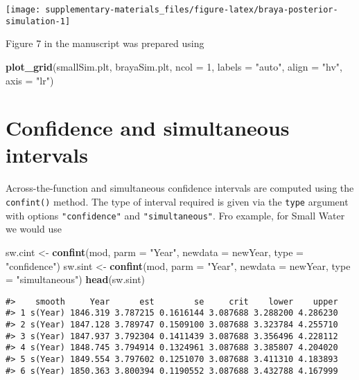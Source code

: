 \documentclass[12pt,]{article}
\newenvironment{Shaded}{\begin{snugshade}}{\end{snugshade}}
\newcommand{\KeywordTok}[1]{\textcolor[rgb]{0.13,0.29,0.53}{\textbf{{#1}}}}
\newcommand{\DataTypeTok}[1]{\textcolor[rgb]{0.13,0.29,0.53}{{#1}}}
\newcommand{\DecValTok}[1]{\textcolor[rgb]{0.00,0.00,0.81}{{#1}}}
\newcommand{\StringTok}[1]{\textcolor[rgb]{0.31,0.60,0.02}{{#1}}}
\newcommand{\NormalTok}[1]{{#1}}
\begin{document}
\begin{center}\texttt{[image: supplementary-materials\_files/figure-latex/braya-posterior-simulation-1]} \end{center}

Figure 7 in the manuscript was prepared using

\begin{Shaded}
\begin{Highlighting}[]
\KeywordTok{plot_grid}\NormalTok{(smallSim.plt, brayaSim.plt, }\DataTypeTok{ncol =} \DecValTok{1}\NormalTok{, }\DataTypeTok{labels =} \StringTok{"auto"}\NormalTok{,}
          \DataTypeTok{align =} \StringTok{"hv"}\NormalTok{, }\DataTypeTok{axis =} \StringTok{"lr"}\NormalTok{)}
\end{Highlighting}
\end{Shaded}

\section{Confidence and simultaneous
intervals}\label{confidence-and-simultaneous-intervals}

Across-the-function and simultaneous confidence intervals are computed
using the \texttt{confint()} method. The type of interval required is
given via the \texttt{type} argument with options \texttt{"confidence"}
and \texttt{"simultaneous"}. Fro example, for Small Water we would use

\begin{Shaded}
\begin{Highlighting}[]
\NormalTok{sw.cint <-}\StringTok{ }\KeywordTok{confint}\NormalTok{(mod, }\DataTypeTok{parm =} \StringTok{"Year"}\NormalTok{, }\DataTypeTok{newdata =} \NormalTok{newYear,}
                   \DataTypeTok{type =} \StringTok{"confidence"}\NormalTok{)}
\NormalTok{sw.sint <-}\StringTok{ }\KeywordTok{confint}\NormalTok{(mod, }\DataTypeTok{parm =} \StringTok{"Year"}\NormalTok{, }\DataTypeTok{newdata =} \NormalTok{newYear,}
                   \DataTypeTok{type =} \StringTok{"simultaneous"}\NormalTok{)}
\KeywordTok{head}\NormalTok{(sw.sint)}
\end{Highlighting}
\end{Shaded}

\begin{verbatim}
#>    smooth     Year      est        se     crit    lower    upper
#> 1 s(Year) 1846.319 3.787215 0.1616144 3.087688 3.288200 4.286230
#> 2 s(Year) 1847.128 3.789747 0.1509100 3.087688 3.323784 4.255710
#> 3 s(Year) 1847.937 3.792304 0.1411439 3.087688 3.356496 4.228112
#> 4 s(Year) 1848.745 3.794914 0.1324961 3.087688 3.385807 4.204020
#> 5 s(Year) 1849.554 3.797602 0.1251070 3.087688 3.411310 4.183893
#> 6 s(Year) 1850.363 3.800394 0.1190552 3.087688 3.432788 4.167999
\end{verbatim}
\end{document}
